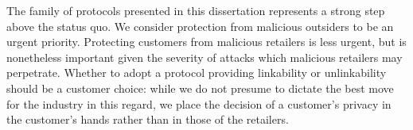 The family of protocols presented in this dissertation represents a strong step above the status quo.
We consider protection from malicious outsiders to be an urgent priority.
Protecting customers from malicious retailers is less urgent, but is nonetheless important given the severity of attacks which malicious retailers may perpetrate.
Whether to adopt a protocol providing linkability or unlinkability should be a customer choice:
    while we do not presume to dictate the best move for the industry in this regard,
    we place the decision of a customer's privacy in the customer's hands rather than in those of the retailers.
